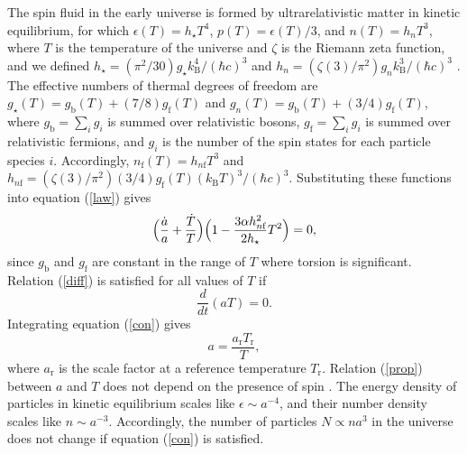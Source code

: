 \documentclass[prd,onecolumn,nofootinbib]{revtex4}
\begin{document}
The spin fluid in the early universe is formed by ultrarelativistic matter in kinetic equilibrium, for which $\epsilon(T)=h_\star T^4$, $p(T)=\epsilon(T)/3$, and $n(T)=h_n T^3$, where $T$ is the temperature of the universe and $\zeta$ is the Riemann zeta function, and we defined $h_\star=(\pi^2/30)g_\star k_\textrm{B}^4/(\hbar c)^3$ and $h_n=(\zeta(3)/\pi^2)g_n k_\textrm{B}^3/(\hbar c)^3$ \cite{Ric}.
The effective numbers of thermal degrees of freedom are $g_\star(T)=g_\textrm{b}(T)+(7/8)g_\textrm{f}(T)$ and $g_n(T)=g_\textrm{b}(T)+(3/4)g_\textrm{f}(T)$, where $g_\textrm{b}=\sum_i g_i$ is summed over relativistic bosons, $g_\textrm{f}=\sum_i g_i$ is summed over relativistic fermions, and $g_i$ is the number of the spin states for each particle species $i$.
Accordingly, $n_\textrm{f}(T)=h_{n\textrm{f}}T^3$ and $h_{n\textrm{f}}=(\zeta(3)/\pi^2)(3/4)g_\textrm{f}(T)(k_\textrm{B}T)^3/(\hbar c)^3$.
Substituting these functions into equation (\ref{law}) gives
\begin{equation}
\Bigl(\frac{\dot{a}}{a}+\frac{\dot{T}}{T}\Bigr)\Bigl(1-\frac{3\alpha h_{n\textrm{f}}^2}{2h_\star}T^2\Bigr)=0,
\label{diff}
\end{equation}
since $g_\textrm{b}$ and $g_\textrm{f}$ are constant in the range of $T$ where torsion is significant.
Relation (\ref{diff}) is satisfied for all values of $T$ if
\begin{equation}
\frac{d}{dt}(aT)=0.
\label{con}
\end{equation}
Integrating equation (\ref{con}) gives
\begin{equation}
a=\frac{a_\textrm{r} T_\textrm{r}}{T},
\label{prop}
\end{equation}
where $a_\textrm{r}$ is the scale factor at a reference temperature $T_\textrm{r}$.
Relation (\ref{prop}) between $a$ and $T$ does not depend on the presence of spin \cite{torsion1}.
The energy density of particles in kinetic equilibrium scales like $\epsilon\sim a^{-4}$, and their number density scales like $n\sim a^{-3}$.
Accordingly, the number of particles $N\propto na^3$ in the universe does not change if equation (\ref{con}) is satisfied.\\
\end{document}
